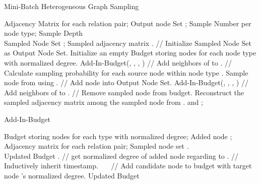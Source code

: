 \documentclass[sigconf]{acmart}
\theoremstyle{definition}
\begin{document}
{\begin{algorithm}[tb] 
\caption{Mini-Batch Heterogeneous Graph Sampling} 
\label{alg:sample} 
\begin{algorithmic}[1] 
\REQUIRE
Adjacency Matrix  for each  relation pair; Output node Set ; Sample Number  per node type; Sample Depth \\
\ENSURE
Sampled Node Set ; Sampled adjacency matrix .
\STATE   // Initialize Sampled Node Set as Output Node Set.
\STATE  Initialize an empty Budget  storing nodes for each node type with normalized degree. 
\FOR {}
    \STATE  Add-In-Budget(, , , ) // Add neighbors of  to .
\ENDFOR
{}
        \STATE   // Calculate sampling probability for each source node  within node type . \label{line:prob}
         \label{line:samp}
            \STATE  Sample node  from  using .
            \STATE   // Add node  into Output Node Set.
            \STATE  Add-In-Budget(, , , ) // Add neighbors of  to .
            \STATE   // Remove sampled node  from budget. \label{line:end}
        \ENDFOR
    \ENDFOR
\ENDFOR
\STATE  Reconstruct the sampled adjacency matrix  among the sampled node  from .
\RETURN  and ; 
\end{algorithmic} 
\end{algorithm}


 


\begin{algorithm}[tb] 
\caption{Add-In-Budget} 
\label{alg:budget} 
\begin{algorithmic}[1] 
\REQUIRE
Budget  storing nodes for each type with normalized degree; Added node ; Adjacency matrix  for each  relation pair; Sampled node set .\\
\ENSURE
Updated Budget .
\STATE   // get normalized degree of added node  regarding to .
             \label{line:check}
                     \STATE   // Inductively inherit timestamp. \label{line:time}
                 \ENDIF
                \STATE  \ \ \ // Add candidate node  to budget  with target node 's normalized degree. \label{line:update}
            \ENDIF
        \ENDFOR  
    \ENDFOR
\RETURN Updated Budget 
\end{algorithmic} 
\end{algorithm}


 


}
\end{document}
